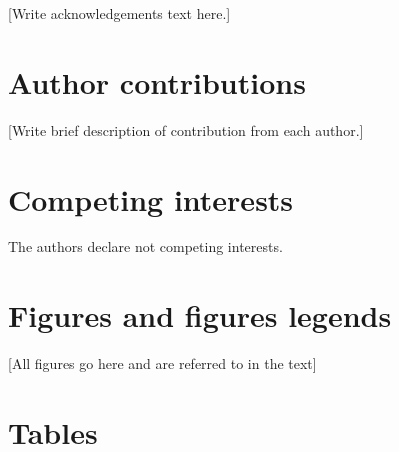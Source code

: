\documentclass[english]{article}
\begin{document}
[Write acknowledgements text here.]

\section*{Author contributions}


[Write brief description of contribution from each author.]

\section*{Competing interests}


The authors declare not competing interests.

\section*{Figures and figures legends}



[All figures go here and are referred to in the text]

\section*{Tables}
\end{document}
